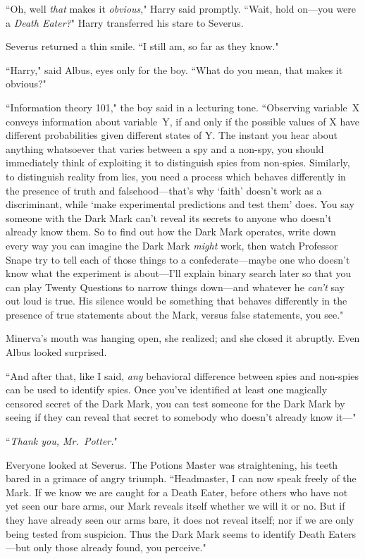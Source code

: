 ``Oh, well \emph{that} makes it \emph{obvious}," Harry said promptly. ``Wait, hold on—you were a \emph{Death Eater?}" Harry transferred his stare to Severus.

Severus returned a thin smile. ``I still am, so far as they know."

``Harry," said Albus, eyes only for the boy. ``What do you mean, that makes it obvious?"

``Information theory 101," the boy said in a lecturing tone. ``Observing variable~X conveys information about variable~Y, if and only if the possible values of X have different probabilities given different states of Y\@. The instant you hear about anything whatsoever that varies between a spy and a non-spy, you should immediately think of exploiting it to distinguish spies from non-spies. Similarly, to distinguish reality from lies, you need a process which behaves differently in the presence of truth and falsehood—that's why `faith' doesn't work as a discriminant, while `make experimental predictions and test them' does. You say someone with the Dark Mark can't reveal its secrets to anyone who doesn't already know them. So to find out how the Dark Mark operates, write down every way you can imagine the Dark Mark \emph{might} work, then watch Professor Snape try to tell each of those things to a confederate—maybe one who doesn't know what the experiment is about—I'll explain binary search later so that you can play Twenty Questions to narrow things down—and whatever he \emph{can't} say out loud is true. His silence would be something that behaves differently in the presence of true statements about the Mark, versus false statements, you see."

Minerva's mouth was hanging open, she realized; and she closed it abruptly. Even Albus looked surprised.

``And after that, like I said, \emph{any} behavioral difference between spies and non-spies can be used to identify spies. Once you've identified at least one magically censored secret of the Dark Mark, you can test someone for the Dark Mark by seeing if they can reveal that secret to somebody who doesn't already know it—"

``\emph{Thank you, Mr.~Potter.}"

Everyone looked at Severus. The Potions Master was straightening, his teeth bared in a grimace of angry triumph. ``Headmaster, I can now speak freely of the Mark. If we know we are caught for a Death Eater, before others who have not yet seen our bare arms, our Mark reveals itself whether we will it or no. But if they have already seen our arms bare, it does not reveal itself; nor if we are only being tested from suspicion. Thus the Dark Mark seems to identify Death Eaters—but only those already found, you perceive."

